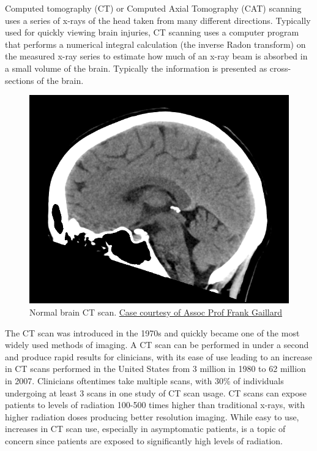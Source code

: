 Computed tomography (CT) or Computed Axial Tomography (CAT) scanning uses a series of x-rays of the head taken from many different directions. Typically used for quickly viewing brain injuries, CT scanning uses a computer program that performs a numerical integral calculation (the inverse Radon transform) on the measured x-ray series to estimate how much of an x-ray beam is absorbed in a small volume of the brain. Typically the information is presented as cross-sections of the brain.



\begin{figure}

{\centering \includegraphics[width=0.7\linewidth]{./figures/nervoussystem/normal-brain-ct} 

}

\caption{Normal brain CT scan. \href{https://radiopaedia.org/cases/35508}{Case courtesy of Assoc Prof Frank Gaillard}}\label{fig:brainct}
\end{figure}

The CT scan was introduced in the 1970s and quickly became one of the most widely used methods of imaging. A CT scan can be performed in under a second and produce rapid results for clinicians, with its ease of use leading to an increase in CT scans performed in the United States from 3 million in 1980 to 62 million in 2007. Clinicians oftentimes take multiple scans, with 30\% of individuals undergoing at least 3 scans in one study of CT scan usage. CT scans can expose patients to levels of radiation 100-500 times higher than traditional x-rays, with higher radiation doses producing better resolution imaging. While easy to use, increases in CT scan use, especially in asymptomatic patients, is a topic of concern since patients are exposed to significantly high levels of radiation.


